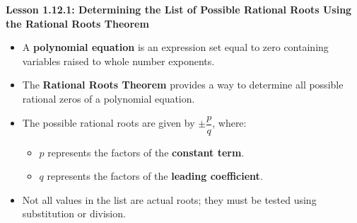 \begin{center}
\textbf{Lesson 1.12.1: Determining the List of Possible Rational Roots Using the Rational Roots Theorem}
\end{center}

\vspace*{-1.5ex}

\begin{itemize}
    \item A \textbf{polynomial equation} is an expression set equal to zero containing variables raised to whole number exponents.
    \item The \textbf{Rational Roots Theorem} provides a way to determine all possible rational zeros of a polynomial equation.
    \item The possible rational roots are given by \( \pm \dfrac{p}{q} \), where:
    \begin{itemize}
        \item \( p \) represents the factors of the \textbf{constant term}.
        \item \( q \) represents the factors of the \textbf{leading coefficient}.
    \end{itemize}
    \item Not all values in the list are actual roots; they must be tested using substitution or division.
\end{itemize}